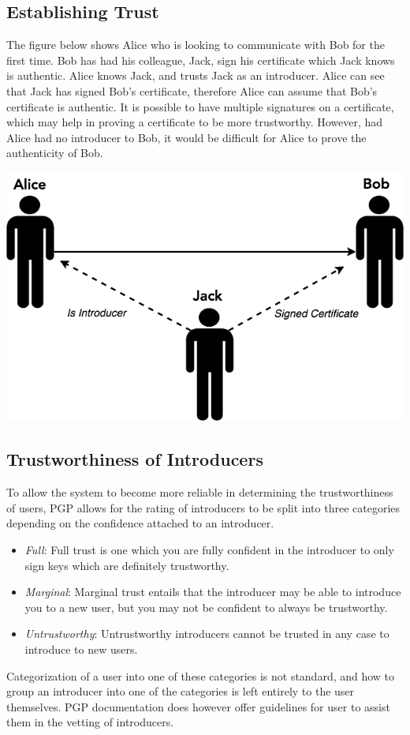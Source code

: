 \subsection{Establishing Trust}

The figure below shows Alice who is looking to communicate with Bob for the first time. Bob has had his colleague, Jack, sign his certificate which Jack knows is authentic. Alice knows Jack, and trusts Jack as an introducer. Alice can see that Jack has signed Bob’s certificate, therefore Alice can assume that Bob’s certificate is authentic. It is possible to have multiple signatures on a certificate, which may help in proving a certificate to be more trustworthy. However, had Alice had no introducer to Bob, it would be difficult for Alice to prove the authenticity of Bob.

\begin{center}
  \includegraphics[scale=.6]{WOT.png}
  \label{fig:Prob1:MEA}
\end{center}

\subsection{Trustworthiness of Introducers}
To allow the system to become more reliable in determining the trustworthiness of  users, PGP allows for the rating of introducers to be split into three categories depending on the confidence attached to an introducer.
\begin{itemize}
  \item \textit{Full}: Full trust is one which you are fully confident in the introducer to only sign keys which are definitely trustworthy.
  \item \textit{Marginal}: Marginal trust entails that the introducer may be able to introduce you to a new user, but you may not be confident to always be trustworthy.
  \item \textit{Untrustworthy}: Untrustworthy introducers cannot be trusted in any case to introduce to new users.
\end{itemize}
Categorization of a user into one of these categories is not standard, and how to group an introducer into one of the categories is left entirely to the user themselves. PGP documentation does however offer guidelines for user to assist them in the vetting of  introducers.
